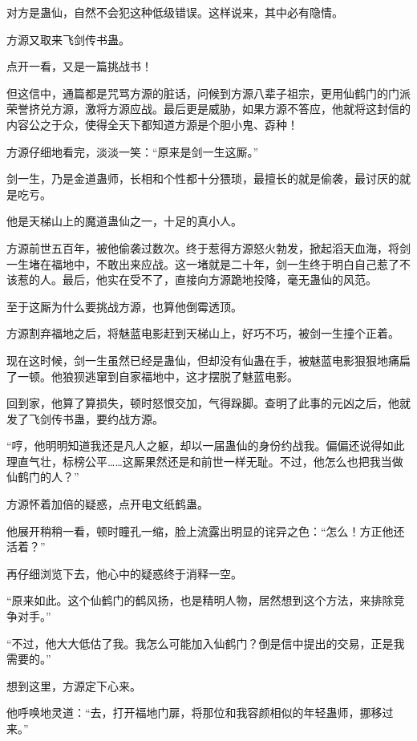\begin{this_body}
对方是蛊仙，自然不会犯这种低级错误。这样说来，其中必有隐情。

方源又取来飞剑传书蛊。

点开一看，又是一篇挑战书！

但这信中，通篇都是咒骂方源的脏话，问候到方源八辈子祖宗，更用仙鹤门的门派荣誉挤兑方源，激将方源应战。最后更是威胁，如果方源不答应，他就将这封信的内容公之于众，使得全天下都知道方源是个胆小鬼、孬种！

方源仔细地看完，淡淡一笑：“原来是剑一生这厮。”

剑一生，乃是金道蛊师，长相和个性都十分猥琐，最擅长的就是偷袭，最讨厌的就是吃亏。

他是天梯山上的魔道蛊仙之一，十足的真小人。

方源前世五百年，被他偷袭过数次。终于惹得方源怒火勃发，掀起滔天血海，将剑一生堵在福地中，不敢出来应战。这一堵就是二十年，剑一生终于明白自己惹了不该惹的人。最后，他实在受不了，直接向方源跪地投降，毫无蛊仙的风范。

至于这厮为什么要挑战方源，也算他倒霉透顶。

方源割弃福地之后，将魅蓝电影赶到天梯山上，好巧不巧，被剑一生撞个正着。

现在这时候，剑一生虽然已经是蛊仙，但却没有仙蛊在手，被魅蓝电影狠狠地痛扁了一顿。他狼狈逃窜到自家福地中，这才摆脱了魅蓝电影。

回到家，他算了算损失，顿时怒恨交加，气得跺脚。查明了此事的元凶之后，他就发了飞剑传书蛊，要约战方源。

“哼，他明明知道我还是凡人之躯，却以一届蛊仙的身份约战我。偏偏还说得如此理直气壮，标榜公平……这厮果然还是和前世一样无耻。不过，他怎么也把我当做仙鹤门的人？”

方源怀着加倍的疑惑，点开电文纸鹤蛊。

他展开稍稍一看，顿时瞳孔一缩，脸上流露出明显的诧异之色：“怎么！方正他还活着？”

再仔细浏览下去，他心中的疑惑终于消释一空。

“原来如此。这个仙鹤门的鹤风扬，也是精明人物，居然想到这个方法，来排除竞争对手。”

“不过，他大大低估了我。我怎么可能加入仙鹤门？倒是信中提出的交易，正是我需要的。”

想到这里，方源定下心来。

他呼唤地灵道：“去，打开福地门扉，将那位和我容颜相似的年轻蛊师，挪移过来。”

\end{this_body}

